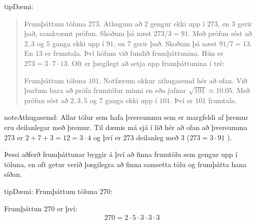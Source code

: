 \documentclass[a4paper,10pt,icelandic]{sphinxmanual}
\begin{document}
\begin{sphinxadmonition}{tip}{Dæmi:}\begin{quote}

 Frumþáttum töluna \(273\). Athugum að \(2\) gengur ekki upp í \(273\), en \(3\) gerir það, samkvæmt prófun. Skoðum þá næst \(273/3=91\). Með prófun sést að \(2,3\) og \(5\) ganga ekki upp í \(91\), en \(7\) gerir það.  Skoðum þá næst \(91/7=13\). En \(13\) er frumtala. Því höfum við fundið frumþáttunina. Hún er \(273=3 \cdot 7 \cdot 13\). Oft er þægilegt að setja upp frumþáttunina í tré:


 Frumþáttum töluna \(101\). Notfærum okkur athugasemd hér að ofan. Við þurfum bara að prófa frumtölur minni en eða jafnar \(\sqrt{101} \approx 10.05\). Með prófun sést að \(2, 3,5\) og \(7\) ganga ekki upp í \(101\). Því er \(101\) frumtala.
\end{quote}

\begin{sphinxadmonition}{note}{Athugasemd:}
Allar tölur sem hafa þversummu sem er margfeldi af þremur eru deilanlegar með þremur.
Til dæmis má sjá í lið  hér að ofan að þversumma 273 er \(2+7+3 = 12 =3 \cdot 4\) og því er 273 deilanleg með 3 (\(273=3\cdot 91\) ).
\end{sphinxadmonition}
\end{sphinxadmonition}

Þessi aðferð frumþáttunar byggir á því að finna frumtölu sem gengur upp í töluna, en oft getur verið þægilegra að finna samsetta tölu og frumþátta hana síðan.

\begin{sphinxadmonition}{tip}{Dæmi:}
Frumþáttum töluna 270:

\begin{figure}[H]
\centering

\noindent{}
\end{figure}

Frumþáttun 270 er því:
\begin{equation*}
\begin{split}270 = 2\cdot 5\cdot 3\cdot 3\cdot 3\end{split}
\end{equation*}\end{sphinxadmonition}
\end{document}
